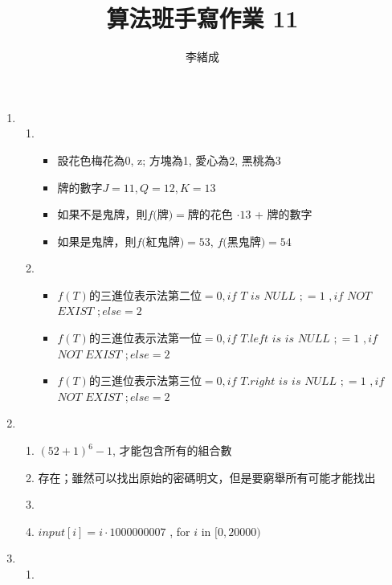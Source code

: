 \documentclass[a4paper, 12pt]{article}
\title{算法班手寫作業 11}
\author{李緒成}
\begin{document}
    \maketitle
    \newpage
    \begin{enumerate}
        \item 
            \begin{enumerate}
                \item 
                    \begin{itemize}
                        \item 設花色梅花為0, z; 方塊為1, 愛心為2, 黑桃為3
                        \item 牌的數字$J=11, Q=12, K=13$
                        \item 如果不是鬼牌，則$f($牌$)=$牌的花色 $\cdot 13$ + 牌的數字
                        \item 如果是鬼牌，則$f($紅鬼牌$)=53$, $f($黑鬼牌$)=54$
                    \end{itemize}
                \item 
                    \begin{itemize}
                        \item $f(T)$的三進位表示法第二位$=0, if$ $T$ $is$ $NULL$ $;=1$ $,if$ $NOT$ $EXIST$ $;else = 2$
                        \item $f(T)$的三進位表示法第一位$=0, if$ $T.left$ $is$ $is$ $NULL$ $;=1$ $,if$ $NOT$ $EXIST$ $;else = 2$
                        \item $f(T)$的三進位表示法第三位$=0, if$ $T.right$ $is$ $is$ $NULL$ $;=1$ $,if$ $NOT$ $EXIST$ $;else = 2$
                    \end{itemize}
            \end{enumerate}
        \item 
            \begin{enumerate}
                \item $(52+1)^6-1$, 才能包含所有的組合數
                \item 存在；雖然可以找出原始的密碼明文，但是要窮舉所有可能才能找出
                \item 
                \item $input[i] = i\cdot 1000000007$ , for $i$ in $[0, 20000)$
            \end{enumerate}    
        \item 
            \begin{enumerate}
                \item 

\end{enumerate}
\end{enumerate}
\end{document}
